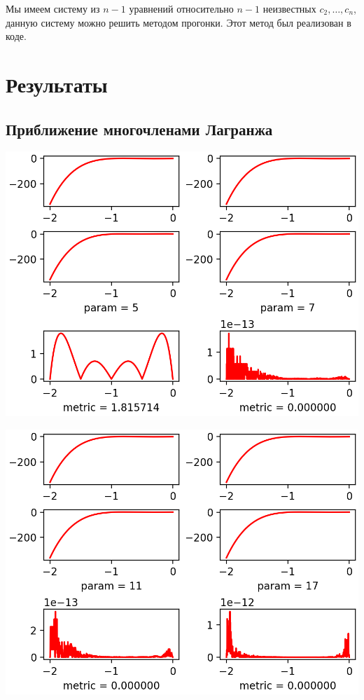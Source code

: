 \documentclass{article}
\begin{document}
\begin{description}
    Мы имеем систему из \(n-1\) уравнений относительно \(n-1\) неизвестных \(c_2,\dots,c_n\), данную систему можно решить методом прогонки. Этот метод был реализован в коде. 
    
\end{description}

\section{Результаты}

\subsection{Приближение многочленами Лагранжа}
\begin{Center}
\includegraphics{F1_p5p7_Lagrange.png}
\hfill

\includegraphics{F1_p11p17_Lagrange.png}
\hfill


\end{Center}
\end{document}
